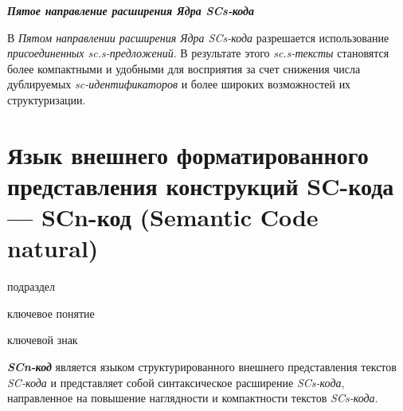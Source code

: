 \textbf{\textit{Пятое направление расширения Ядра SCs-кода}}

В \textit{Пятом направлении расширения Ядра SCs-кода} разрешается использование \textit{присоединенных \mbox{sc.s-предложений}}. В результате этого \textit{sc.s-тексты} становятся более компактными и удобными для восприятия за счет снижения числа дублируемых \textit{sc-идентификаторов} и более широких возможностей их структуризации.

\section{Язык внешнего форматированного представления конструкций SC-кода --- SCn-код (Semantic Code natural)}
\label{sec_scn}

\begin{SCn}
\begin{scnrelfromlist}{подраздел}
\end{scnrelfromlist}

\begin{scnrelfromlist}{ключевое понятие}
\end{scnrelfromlist}

\begin{scnrelfromlist}{ключевой знак}
\end{scnrelfromlist}
\end{SCn}

\begin{SCn}
\end{SCn}

\textbf{\textit{SCn-код}} является языком структурированного внешнего представления текстов \textit{SC-кода} и представляет собой синтаксическое расширение \textit{SCs-кода}, направленное на повышение наглядности и компактности текстов \textit{SCs-кода}. 

